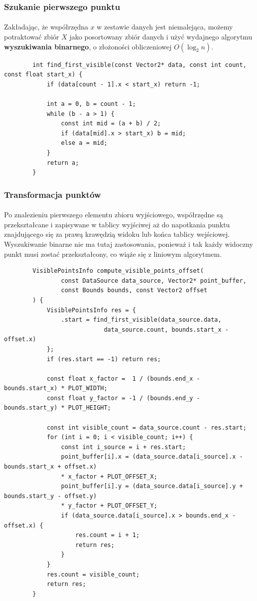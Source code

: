 \documentclass[12pt]{report}
\begin{document}
	\subsubsection{Szukanie pierwszego punktu}
	\paragraph{}
	Zakładając, że współrzędna $x$ w zestawie danych jest niemalejąca, możemy potraktować zbiór $X$ jako posortowany zbiór danych i użyć wydajnego algorytmu \textbf{wyszukiwania binarnego}, o złożoności obliczeniowej $O(\log_2n)$.
	
	\begin{verbatim}
		int find_first_visible(const Vector2* data, const int count, const float start_x) {
			if (data[count - 1].x < start_x) return -1;
			
			int a = 0, b = count - 1;
			while (b - a > 1) {
				const int mid = (a + b) / 2;
				if (data[mid].x > start_x) b = mid;
				else a = mid;
			}
			return a;
		}
	\end{verbatim}
	
	\subsubsection{Transformacja punktów}
	\paragraph{}
	Po znalezieniu pierwszego elementu zbioru wyjściowego, współrzędne są przekształcane i zapisywane w tablicy wyjściwej aż do napotkania punktu znajdującego się za prawą krawędzią widoku lub końca tablicy wejściowej. Wyszukiwanie binarne nie ma tutaj zastosowania, ponieważ i tak każdy widoczny punkt musi zostać przekształcony, co wiąże się z liniowym algorytmem.
	
	\begin{verbatim}
		VisiblePointsInfo compute_visible_points_offset(
				const DataSource data_source, Vector2* point_buffer,
				const Bounds bounds, const Vector2 offset
		) {
			VisiblePointsInfo res = {
				.start = find_first_visible(data_source.data,
							data_source.count, bounds.start_x - offset.x)
			};
			if (res.start == -1) return res;
			
			const float x_factor =  1 / (bounds.end_x - bounds.start_x) * PLOT_WIDTH;
			const float y_factor = -1 / (bounds.end_y - bounds.start_y) * PLOT_HEIGHT;
			
			const int visible_count = data_source.count - res.start;
			for (int i = 0; i < visible_count; i++) {
				const int i_source = i + res.start;
				point_buffer[i].x = (data_source.data[i_source].x - bounds.start_x + offset.x)
				* x_factor + PLOT_OFFSET_X;
				point_buffer[i].y = (data_source.data[i_source].y + bounds.start_y - offset.y)
				* y_factor + PLOT_OFFSET_Y;
				if (data_source.data[i_source].x > bounds.end_x - offset.x) {
					res.count = i + 1;
					return res;
				}
			}
			res.count = visible_count;
			return res;
		}
	\end{verbatim}
\end{document}
